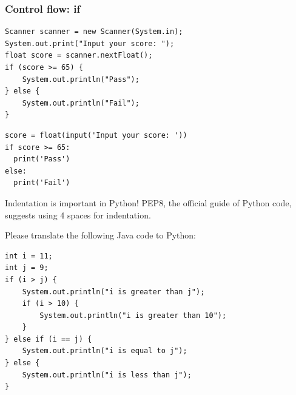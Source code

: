 \documentclass[aspectratio=169, 14pt]{beamer}
\begin{document}
\begin{frame}[fragile]
	\frametitle{Control flow: if}
	\begin{verbatim}
Scanner scanner = new Scanner(System.in);
System.out.print("Input your score: ");
float score = scanner.nextFloat();
if (score >= 65) {
    System.out.println("Pass");
} else {
    System.out.println("Fail");
}
\end{verbatim}
\end{frame}

\begin{frame}[fragile]

	\begin{verbatim}
score = float(input('Input your score: '))
if score >= 65:
  print('Pass')
else:
  print('Fail')
  \end{verbatim}
	\alert{Indentation} is important in Python! PEP8, the official guide of Python code, suggests using \alert{4 spaces} for indentation.
\end{frame}

\begin{frame}[fragile]
	Please translate the following Java code to Python:

	\begin{verbatim}
int i = 11;
int j = 9;
if (i > j) {
    System.out.println("i is greater than j");
    if (i > 10) {
        System.out.println("i is greater than 10");
    }
} else if (i == j) {
    System.out.println("i is equal to j");
} else {
    System.out.println("i is less than j");
}
  \end{verbatim}
\end{frame}
\end{document}
